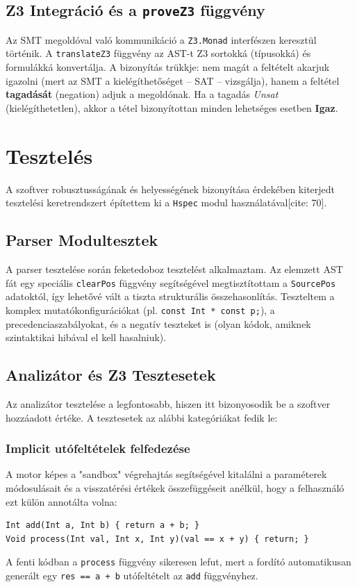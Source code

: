 \documentclass[
    hungarian,
    parspace
]{elteikthesis}
\begin{document}
\section{Z3 Integráció és a \texttt{proveZ3} függvény}
Az SMT megoldóval való kommunikáció a \texttt{Z3.Monad} interfészen keresztül történik. A \texttt{translateZ3} függvény az AST-t Z3 sortokká (típusokká) és formulákká konvertálja. A bizonyítás trükkje: nem magát a feltételt akarjuk igazolni (mert az SMT a kielégíthetőséget -- SAT -- vizsgálja), hanem a feltétel \textbf{tagadását} (negation) adjuk a megoldónak. Ha a tagadás \textit{Unsat} (kielégíthetetlen), akkor a tétel bizonyítottan minden lehetséges esetben \textbf{Igaz}.

\chapter{Tesztelés}
A szoftver robusztusságának és helyességének bizonyítása érdekében kiterjedt tesztelési keretrendszert építettem ki a \texttt{Hspec} modul használatával[cite: 70].

\section{Parser Modultesztek}
A parser tesztelése során feketedoboz tesztelést alkalmaztam. Az elemzett AST fát egy speciális \texttt{clearPos} függvény segítségével megtisztítottam a \texttt{SourcePos} adatoktól, így lehetővé vált a tiszta strukturális összehasonlítás.
Teszteltem a komplex mutatókonfigurációkat (pl. \texttt{const Int * const p;}), a precedenciaszabályokat, és a negatív teszteket is (olyan kódok, amiknek szintaktikai hibával el kell hasalniuk).

\section{Analizátor és Z3 Tesztesetek}
Az analizátor tesztelése a legfontosabb, hiszen itt bizonyosodik be a szoftver hozzáadott értéke. A tesztesetek az alábbi kategóriákat fedik le:

\subsection{Implicit utófeltételek felfedezése}
A motor képes a "sandbox" végrehajtás segítségével kitalálni a paraméterek módosulásait és a visszatérési értékek összefüggéseit anélkül, hogy a felhasználó ezt külön annotálta volna:
\begin{verbatim}
Int add(Int a, Int b) { return a + b; }
Void process(Int val, Int x, Int y)(val == x + y) { return; }
\end{verbatim}
A fenti kódban a \texttt{process} függvény sikeresen lefut, mert a fordító automatikusan generált egy \texttt{res == a + b} utófeltételt az \texttt{add} függvényhez.
\end{document}
